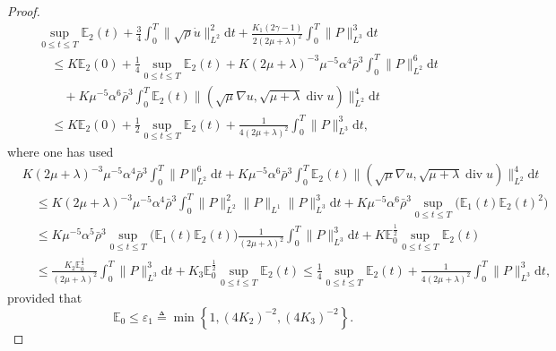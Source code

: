 \documentclass[11pt]{article}
\DeclareMathOperator{\divv}{div}
\begin{document}
\begin{proof}
\begin{align*}
& \sup_{0 \leq t \leq T} \mathbb{E}_2 (t) + \frac{3}{4}\int^T_0 \|\sqrt{\rho} \dot{u}\|_{L^2}^2 \mathrm{d} t + \frac{K_1 \left( 2 \gamma - 1\right)}{2 \left(2 \mu + \lambda \right)^2} \int^T_0 \|P\|_{L^3}^3 \mathrm{d} t\\
& \quad \leq K \mathbb{E}_2 (0) + \frac{1}{4} \sup_{0 \leq t \leq T} \mathbb{E}_2 (t) + K \left( 2 \mu + \lambda \right)^{-3} \mu^{-5} \alpha^4 \bar{\rho}^3 \int^T_0 \|P\|_{L^2}^6 \mathrm{d} t\\
& \qquad + K \mu^{-5} \alpha^6 \bar{\rho}^3 \int^T_0 \mathbb{E}_2 (t) \|(\sqrt{\mu}\nabla u, \sqrt{\mu + \lambda} \divv u)\|_{L^2}^4 \mathrm{d} t\\
& \quad \leq K \mathbb{E}_2 (0) + \frac{1}{2} \sup_{0 \leq t \leq T} \mathbb{E}_2 (t) + \frac{1}{4 \left(2 \mu + \lambda \right)^2} \int^T_0 \|P\|_{L^3}^3 \mathrm{d} t,
\end{align*}
where one has used
\begin{align*}
& K \left( 2 \mu + \lambda \right)^{-3} \mu^{-5} \alpha^4 \bar{\rho}^3 \int^T_0 \|P\|_{L^2}^6 \mathrm{d} t + K \mu^{-5} \alpha^6 \bar{\rho}^3 \int^T_0 \mathbb{E}_2 (t) \|(\sqrt{\mu}\nabla u, \sqrt{\mu + \lambda} \divv u)\|_{L^2}^4 \mathrm{d} t\\
& \quad \leq K \left( 2 \mu + \lambda \right)^{-3} \mu^{-5} \alpha^4 \bar{\rho}^3 \int^T_0 \|P\|_{L^2}^2 \|P\|_{L^1} \|P\|_{L^3}^3 \mathrm{d} t + K \mu^{-5} \alpha^6 \bar{\rho}^3 \sup_{0 \leq t \leq T}\big(\mathbb{E}_1 (t) \mathbb{E}_2(t)^2\big)\\
& \quad  \leq K \mu^{-5} \alpha^5 \bar{\rho}^3 \sup_{0 \leq t \leq T}\big(\mathbb{E}_1(t) \mathbb{E}_2(t)\big)\frac{1}{(2 \mu + \lambda )^2} \int^T_0 \|P\|_{L^3}^3 \mathrm{d} t + K \mathbb{E}_0^{\frac{1}{2}} \sup_{0 \leq t \leq T} \mathbb{E}_2 (t)\\
&  \quad \leq \frac{K_2 \mathbb{E}_0^{\frac{1}{2}}}{(2 \mu + \lambda )^2} \int^T_0 \|P\|_{L^3}^3 \mathrm{d} t + K_3 \mathbb{E}_0^{\frac{1}{2}} \sup_{0 \leq t \leq T} \mathbb{E}_2 (t) \leq \frac{1}{4} \sup_{0 \leq t \leq T} \mathbb{E}_2 (t) + \frac{1}{4 (2 \mu + \lambda )^2} \int^T_0 \|P\|_{L^3}^3 \mathrm{d} t,
\end{align*}
provided that
$$
\mathbb{E}_0 \leq \varepsilon_1 \triangleq \min \left\{1, (4 K_2)^{-2}, (4 K_3)^{-2}\right\}.
$$


\end{proof}
\end{document}
